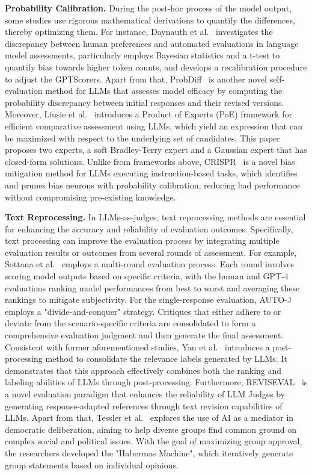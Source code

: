 \textbf{Probability Calibration.}
During the post-hoc process of the model output, some studies use rigorous mathematical derivations to quantify the differences, thereby optimizing them.
For instance, Daynauth et al.~\cite{daynauth2024aligning} investigates the discrepancy between human preferences and automated evaluations in language model assessments, particularly employs Bayesian statistics and a t-test to quantify bias towards higher token counts, and develops a recalibration procedure to adjust the GPTScorers.
Apart from that, ProbDiff~\cite{xia2024language} is another novel self-evaluation method for LLMs that assesses model efficacy by computing the probability discrepancy between initial responses and their revised versions.
Moreover, Liusie et al.~\cite{liusie2024efficient} introduces a Product of Experts (PoE) framework for efficient comparative assessment using LLMs, which yield an expression that can be maximized with respect to the underlying set of candidates. This paper proposes two experts, a soft Bradley-Terry expert and a Gaussian expert that has closed-form solutions.
Unlike from frameworks above, CRISPR~\cite{yang2024mitigating} is a novel bias mitigation method for LLMs executing instruction-based tasks, which identifies and prunes bias neurons with probability calibration, reducing bad performance without compromising pre-existing knowledge.


\textbf{Text Reprocessing.} 
In LLMs-as-judges, text reprocessing methods are essential for enhancing the accuracy and reliability of evaluation outcomes. Specifically, text processing can improve the evaluation process by integrating multiple evaluation results or outcomes from several rounds of assessment.
For example, Sottana et al.~\cite{sottana2023evaluation} employs a multi-round evaluation process. Each round involves scoring model outputs based on specific criteria, with the human and GPT-4 evaluations ranking model performances from best to worst and averaging these rankings to mitigate subjectivity.
For the single-response evaluation, AUTO-J~\cite{li2023generative} employs a "divide-and-conquer" strategy. Critiques that either adhere to or deviate from the scenario-specific criteria are consolidated to form a comprehensive evaluation judgment and then generate the final assessment.
Consistent with former aforementioned studies, Yan et al.~\cite{yan2024consolidating} introduces a post-processing method to consolidate the relevance labels generated by LLMs. It demonstrates that this approach effectively combines both the ranking and labeling abilities of LLMs through post-processing.
Furthermore, REVISEVAL~\cite{zhang2024reviseval} is a novel evaluation paradigm that enhances the reliability of LLM Judges by generating response-adapted references through text revision capabilities of LLMs.
Apart from that, Tessler et al.~\cite{tessler2024ai} explores the use of AI as a mediator in democratic deliberation, aiming to help diverse groups find common ground on complex social and political issues. With the goal of maximizing group approval, the researchers developed the "Habermas Machine", which iteratively generate group statements based on individual opinions.


